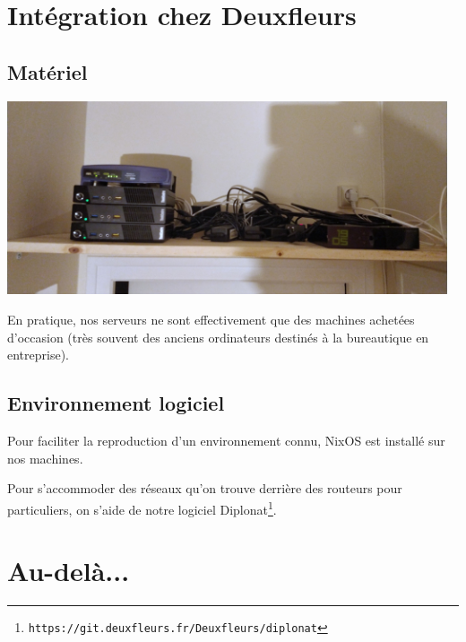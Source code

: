 \documentclass[11pt, aspectratio=1610]{beamer}
\begin{document}
\section{Intégration chez Deuxfleurs}
\subsection{Matériel}
\begin{frame}
\begin{center}
\includegraphics[width=13cm]{neptune.jpg}\linebreak

En pratique, nos serveurs ne sont effectivement que des machines achetées d'occasion (très souvent des anciens ordinateurs destinés à la bureautique en entreprise).
\end{center}
\end{frame}

\subsection{Environnement logiciel}
\begin{frame}
\begin{center}
Pour faciliter la reproduction d'un environnement connu, NixOS est installé sur nos machines.\linebreak

\vspace{1cm}
Pour s’accommoder des réseaux qu'on trouve derrière des routeurs pour particuliers, on s'aide de notre logiciel Diplonat\footnote[frame]{\texttt{https://git.deuxfleurs.fr/Deuxfleurs/diplonat}}.
\end{center}
\end{frame}

\section{Au-delà...}
\end{document}
